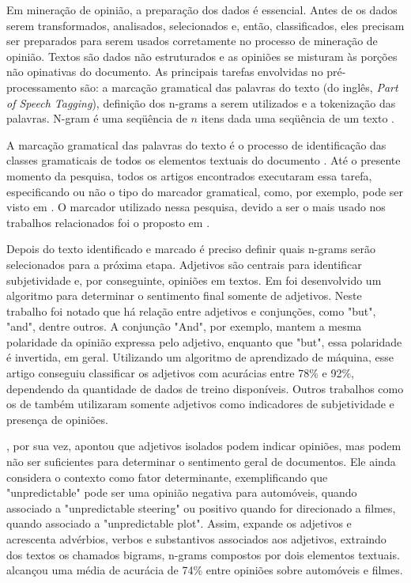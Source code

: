\documentclass[template.tex]{subfiles}
\begin{document}
Em mineração de opinião, a preparação dos dados é essencial. Antes de os dados serem transformados, analisados, selecionados e, então, classificados, eles precisam ser preparados para serem usados corretamente no processo de mineração de opinião. Textos são dados não estruturados e as opiniões se misturam às porções não opinativas do documento. As principais tarefas envolvidas no pré-processamento são: a marcação gramatical das palavras do texto (do inglês, \textit{Part of Speech Tagging}), definição dos n-grams a serem utilizados e a tokenização das palavras. N-gram é uma seqüência de $n$ itens dada uma seqüência de um texto \cite{dave2003mining}. 

A marcação gramatical das palavras do texto é o processo de identificação das classes gramaticais de todos os elementos textuais do documento \cite{brill1995transformation}. Até o presente momento da pesquisa, todos os artigos encontrados executaram essa tarefa, especificando ou não o tipo do marcador gramatical, como, por exemplo, pode ser visto em . O marcador utilizado nessa pesquisa, devido a ser o mais usado nos trabalhos relacionados foi o proposto em .

Depois do texto identificado e marcado é preciso definir quais n-grams serão selecionados para a próxima etapa. Adjetivos são centrais para identificar subjetividade e, por conseguinte, opiniões em textos. Em  foi desenvolvido um algoritmo para determinar o sentimento final somente de adjetivos. Neste trabalho foi notado que há relação entre adjetivos e conjunções, como "but", "and", dentre outros. A conjunção "And", por exemplo, mantem a mesma polaridade da opinião expressa pelo adjetivo, enquanto que "but", essa polaridade é invertida, em geral. Utilizando um algoritmo de aprendizado de máquina, esse artigo conseguiu classificar os adjetivos com acurácias entre 78\% e 92\%, dependendo da quantidade de dados de treino disponíveis. Outros trabalhos como os de  também utilizaram somente adjetivos como indicadores de subjetividade e presença de opiniões.

, por sua vez, apontou que adjetivos isolados podem indicar opiniões, mas podem não ser suficientes para determinar o sentimento geral de documentos. Ele ainda considera o contexto como fator determinante, exemplificando que "unpredictable" pode ser uma opinião negativa para automóveis, quando associado a "unpredictable steering" ou positivo quando for direcionado a filmes, quando associado a "unpredictable plot". Assim,  expande os adjetivos e acrescenta advérbios, verbos e substantivos associados aos adjetivos, extraindo dos textos os chamados bigrams, n-grams compostos por dois elementos textuais.  alcançou uma média de acurácia de 74\% entre opiniões sobre automóveis e filmes. 
\end{document}
